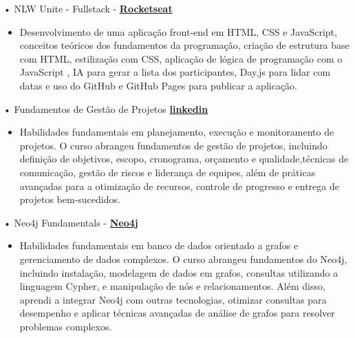 \documentclass[a4paper]{article}
\begin{document}
\vspace*{1mm}
• NLW Unite - Fullstack - \textbf{\href{https://app.rocketseat.com.br/certificates/d3577eb6-c50f-42f3-b595-b96297ef0e05}{Rocketseat}}\\
\begin{itemize}
    \item [] Desenvolvimento de uma aplicação front-end em HTML, CSS e JavaScript, conceitos teóricos dos fundamentos da programação, criação de estrutura base com HTML, estilização com CSS, aplicação de lógica de programação com o JavaScript , IA para gerar a lista dos participantes, Day.js para lidar com datas e uso do GitHub e GitHub Pages para publicar a aplicação.
\end{itemize}
\vspace*{1mm}
• Fundamentos de Gestão de Projetos \textbf{\href{https://www.linkedin.com/learning/certificates/0fc1a744c87dc72f53e8c694fd58809808a183327167377cb224c1ac43e732b6}{linkedin}}\\
\begin{itemize}
    \item [] Habilidades fundamentais em planejamento, execução e monitoramento de projetos. O curso abrangeu fundamentos de gestão de projetos, incluindo definição de objetivos, escopo, cronograma, orçamento e qualidade,técnicas de comunicação, gestão de riscos e liderança de equipes, além de práticas avançadas para a otimização de recursos, controle de progresso e entrega de projetos bem-sucedidos.
\end{itemize}
\vspace*{1mm}
• Neo4j Fundamentals - \textbf{\href{https://graphacademy.neo4j.com/c/9d25b359-5995-4053-8475-7b2bf61f163e/}{Neo4j}}\\
\begin{itemize} \itemsep -3pt
    \item[] Habilidades fundamentais em banco de dados orientado a grafos e gerenciamento de dados complexos. O curso abrangeu fundamentos do Neo4j, incluindo instalação, modelagem de dados em grafos, consultas utilizando a linguagem Cypher, e manipulação de nós e relacionamentos. Além disso, aprendi a integrar Neo4j com outras tecnologias, otimizar consultas para desempenho e aplicar técnicas avançadas de análise de grafos para resolver problemas complexos.
\end{itemize}
\vspace{2mm}

\
\end{document}
